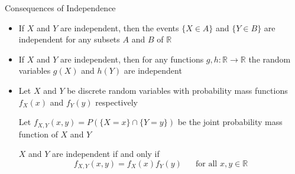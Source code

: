 \documentclass[t]{beamer}
\begin{document}
\begin{frame}{Consequences of Independence}
  \footnotesize
  \begin{itemize}
    \item \pause If $X$ and $Y$ are independent, then the events $\{X \in A\}$ and $\{Y \in B\}$ are independent for any subsets $A$ and $B$ of $\mathbb{R}$
    \item \pause If $X$ and $Y$ are independent, then for any functions $g,h : \mathbb{R} \rightarrow \mathbb{R}$ the random variables $g(X)$ and $h(Y)$ are independent
    \item \pause Let $X$ and $Y$ be discrete random variables with probability mass functions $f_X(x)$ and $f_Y(y)$ respectively

    \pause Let $f_{X,Y}(x,y) = P\left(\{X =x\} \cap \{Y =y\} \right)$ be the joint probability mass function of $X$ and $Y$

    \pause $X$ and $Y$ are independent if and only if
      \begin{equation*}
        f_{X,Y}(x,y) = f_X(x) f_Y(y) \ \ \ \ \ \ \text{ for all } x,y \in \mathbb{R}
      \end{equation*}
  \end{itemize}
  \normalsize
\end{frame}
\end{document}
